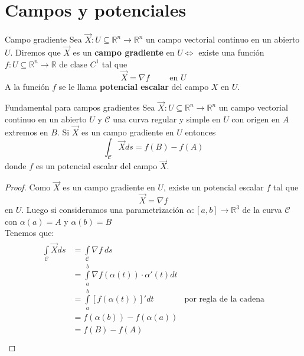 \documentclass{report}
\newcommand\reals{\mathds{R}}
\begin{document}
\chapter{Campos y potenciales}
\begin{defbox}{Campo gradiente}
	Sea $\vec{X}:U \subseteq \reals^n \rightarrow \reals^n$ un campo vectorial continuo en un abierto $U$.
	Diremos que $\vec{X}$ es un \textbf{campo gradiente} en $U \iff$ existe una función $f: U \subseteq \reals^n \rightarrow \reals$ de clase $C^1$ tal que
	\begin{equation}
		\vec{X} = \nabla f~~~~~~~~~~~ \text{en }U
		\label{eq:campo_gradiente}
	\end{equation}
	A la función $f$ se le llama \textbf{potencial escalar} del campo $X$ en $U$.
\end{defbox}

\begin{teobox}{Fundamental para campos gradientes}
	Sea $\vec{X}:U \subseteq \reals^n \rightarrow \reals^n$ un campo vectorial continuo en un abierto $U$ y $\mathcal{C}$ una curva regular y simple en $U$ con origen en $A$ extremos en $B$.
	Si $\vec{X}$ es un campo gradiente en $U$ entonces
	\[
		\int_{\mathcal{C}}{\vec{X}ds} = f(B)-f(A)
	\]
	donde $f$ es un potencial escalar del campo $\vec{X}$.
\end{teobox}
\begin{proof}
	Como $\vec{X}$ es un campo gradiente en $U$, existe un potencial escalar $f$ tal que 
	\[
		\vec{X} = \nabla f
	\]
	 en $U$. Luego si consideramos una parametrización $\alpha : [a,b]\rightarrow \reals^3$ de la curva $\mathcal{C}$ con $\alpha (a) = A$ y $\alpha (b) = B$ \\ 
	 Tenemos que:
	 \begin{gather*}
		 \begin{aligned}
			 \int\limits_{\mathcal{C}}{\vec{X}ds} & = \int\limits_{\mathcal{C}}{\nabla f~ ds} \\ 
												  & = \int\limits_a^b{\nabla f(\alpha (t))\cdot \alpha '(t) dt} \\
												  & = \int\limits_a^b{[f(\alpha (t))]' dt}& \text{por regla de la cadena} \\
												  & = f(\alpha (b))-f(\alpha (a))\\
												  & = f(B)-f(A)\\
		 \end{aligned}
	 \end{gather*}
\end{proof}
\end{document}
